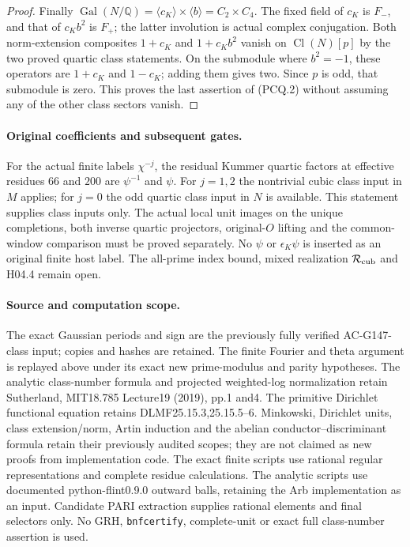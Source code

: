 \begin{proof}
Finally $\operatorname{Gal}(N/\mathbb Q)=\langle c_K\rangle
\times\langle b\rangle=C_2\times C_4$.
The fixed field of $c_K$ is $F_-$, and that of $c_Kb^2$
is $F_+$; the latter involution is actual complex conjugation.
Both norm-extension composites $1+c_K$ and $1+c_Kb^2$
vanish on $\operatorname{Cl}(N)[p]$ by the two proved quartic
class statements.  On the submodule where $b^2=-1$, these
operators are $1+c_K$ and $1-c_K$; adding them gives two.
Since $p$ is odd, that submodule is zero.  This proves the last
assertion of (PCQ.2) without assuming any of the other class
sectors vanish.
\end{proof}

\paragraph{Original coefficients and subsequent gates.}
For the actual finite labels $\chi^{-j}$, the residual Kummer
quartic factors at effective residues $66$ and $200$ are
$\psi^{-1}$ and $\psi$.
For $j=1,2$ the nontrivial cubic class input in $M$ applies;
for $j=0$ the odd quartic class input in $N$ is available.
This statement supplies class inputs only.  The actual local
unit images on the unique completions, both inverse quartic
projectors, original-$O$ lifting and the common-window comparison
must be proved separately.  No $\psi$ or $\epsilon_K\psi$
is inserted as an original finite host label.
The all-prime index bound, mixed realization $\mathcal R_{\rm cub}$
and H04.4 remain open.

\paragraph{Source and computation scope.}
The exact Gaussian periods and sign are the previously fully
verified AC-G147-class input; copies and hashes are retained.
The finite Fourier and theta argument is replayed above under
its exact new prime-modulus and parity hypotheses.
The analytic class-number formula and projected weighted-log
normalization retain Sutherland, MIT18.785 Lecture19 (2019),
pp.1 and4.  The primitive Dirichlet functional equation retains
DLMF25.15.3,25.15.5--6.
Minkowski, Dirichlet units, class extension/norm, Artin induction
and the abelian conductor--discriminant formula retain their
previously audited scopes; they are not claimed as new proofs
from implementation code.  The exact finite scripts use rational
regular representations and complete residue calculations.
The analytic scripts use documented python-flint0.9.0 outward
balls, retaining the Arb implementation as an input.
Candidate PARI extraction supplies rational elements and final
selectors only.  No GRH, \texttt{bnfcertify}, complete-unit or
exact full class-number assertion is used.
